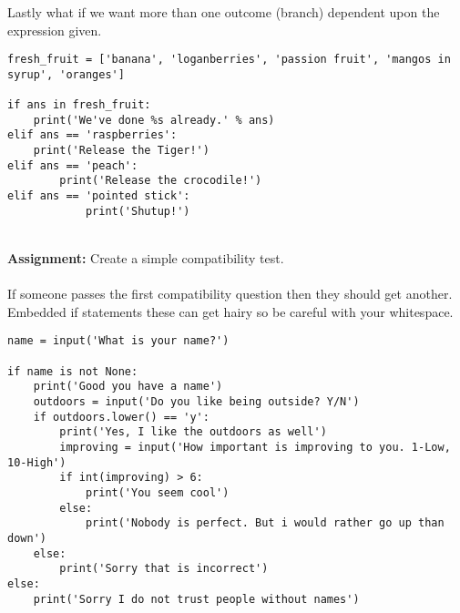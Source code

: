 \documentclass[../main.tex]{subfiles}
\begin{document}
Lastly what if we want more than one outcome (branch) dependent upon the expression given. \\
\begin{lstlisting}
fresh_fruit = ['banana', 'loganberries', 'passion fruit', 'mangos in syrup', 'oranges']

if ans in fresh_fruit:
    print('We've done %s already.' % ans)
elif ans == 'raspberries':
    print('Release the Tiger!')
elif ans == 'peach':
        print('Release the crocodile!')
elif ans == 'pointed stick':
            print('Shutup!')
\end{lstlisting}
\\
\textbf{Assignment:}
Create a simple compatibility test.\\
\\
If someone passes the first compatibility question then they should get another. Embedded if statements these can get hairy so be careful with your whitespace.\\
\begin{lstlisting}[caption=Example]
name = input('What is your name?')

if name is not None:
    print('Good you have a name')
    outdoors = input('Do you like being outside? Y/N')
    if outdoors.lower() == 'y':
        print('Yes, I like the outdoors as well')
        improving = input('How important is improving to you. 1-Low, 10-High')
        if int(improving) > 6:
            print('You seem cool')
        else:
            print('Nobody is perfect. But i would rather go up than down')
    else:
        print('Sorry that is incorrect')
else:
    print('Sorry I do not trust people without names')
\end{lstlisting}
\newpage
\end{document}
